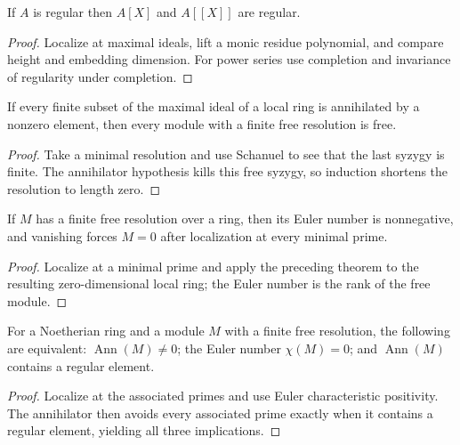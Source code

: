 \begin{theorem}\label{mcrt-thm-19-5}
If $A$ is regular then $A[X]$ and $A[[X]]$ are regular.
\end{theorem}
\begin{proof}
Localize at maximal ideals, lift a monic residue polynomial, and compare height
and embedding dimension.  For power series use completion and invariance of
regularity under completion.
\end{proof}

\begin{theorem}\label{mcrt-thm-19-6}\uses{}
If every finite subset of the maximal ideal of a local ring is annihilated by a
nonzero element, then every module with a finite free resolution is free.
\end{theorem}
\begin{proof}
Take a minimal resolution and use Schanuel to see that the last syzygy is finite.
The annihilator hypothesis kills this free syzygy, so induction shortens the
resolution to length zero.
\end{proof}

\begin{theorem}\label{mcrt-thm-19-7}
If $M$ has a finite free resolution over a ring, then its Euler number is
nonnegative, and vanishing forces $M=0$ after localization at every minimal
prime.
\end{theorem}
\begin{proof}
Localize at a minimal prime and apply the preceding theorem to the resulting
zero-dimensional local ring; the Euler number is the rank of the free module.
\end{proof}

\begin{theorem}\label{mcrt-thm-19-8}
For a Noetherian ring and a module $M$ with a finite free resolution, the
following are equivalent: $\operatorname{Ann}(M)\ne0$; the Euler number
$\chi(M)=0$; and $\operatorname{Ann}(M)$ contains a regular element.
\end{theorem}
\begin{proof}
Localize at the associated primes and use Euler characteristic positivity.  The
annihilator then avoids every associated prime exactly when it contains a
regular element, yielding all three implications.
\end{proof}


